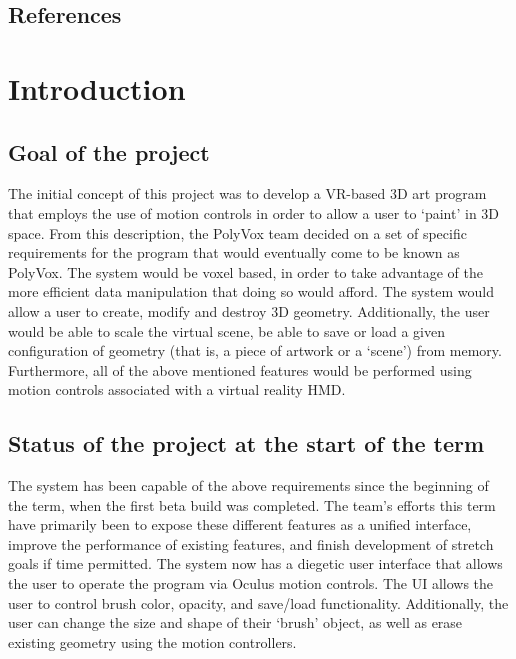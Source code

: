 \documentclass[onecolumn, draftclsnofoot,10pt, compsoc]{IEEEtran}
\begin{document}
\newpage
{}
\tableofcontents
\clearpage


\subsection{References}

{}

\section{Introduction}

\subsection{Goal of the project}
The initial concept of this project was to develop a VR-based 3D art program that employs the use of motion controls in order to allow a user to ‘paint’ in 3D space. From this description, the PolyVox team decided on a set of specific requirements for the program that would eventually come to be known as PolyVox. The system would be voxel based, in order to take advantage of the more efficient data manipulation that doing so would afford. The system would allow a user to create, modify and destroy 3D geometry. Additionally, the user would be able to scale the virtual scene, be able to save or load a given configuration of geometry (that is, a piece of artwork or a ‘scene’) from memory. Furthermore, all of the above mentioned features would be performed using motion controls associated with a virtual reality HMD. 

\subsection{Status of the project at the start of the term}
The system has been capable of the above requirements since the beginning of the term, when the first beta build was completed. The team's efforts this term have primarily been to expose these different features as a unified interface, improve the performance of existing features, and finish development of stretch goals if time permitted. The system now has a diegetic user interface that allows the user to operate the program via Oculus motion controls. The UI allows the user to control brush color, opacity, and save/load functionality. Additionally, the user can change the size and shape of their ‘brush’ object, as well as erase existing geometry using the motion controllers.
\end{document}
